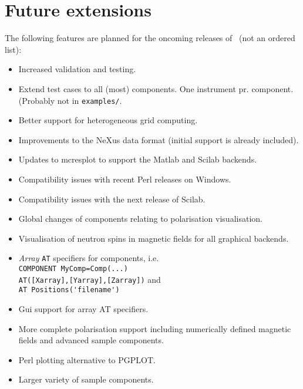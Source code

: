 \section{Future extensions}
\label{s:future}
The following features are planned for the oncoming releases of \MCS\ 
(not an ordered list):
\begin{itemize}
\item Increased validation and testing.
\item Extend test cases to all (most) components. One instrument
  pr. component. (Probably not in \verb+examples/+.
\item Better support for heterogeneous grid computing.
\item Improvements to the NeXus data format (initial support is
  already included).
\item Updates to mcresplot to support the Matlab and Scilab backends.
\item Compatibility issues with recent Perl releases on Windows.
\item Compatibility issues with the next release of Scilab.
\item Global changes of components relating to polarisation
  visualisation.
\item Visualisation of neutron spins in magnetic fields for all
  graphical backends.
\item \emph{Array} \verb+AT+ specifiers for components, i.e. \\
  \verb+COMPONENT MyComp=Comp(...)+\\\verb+AT([Xarray],[Yarray],[Zarray])+ and\\
  \verb+AT Positions('filename')+
\item Gui support for array AT specifiers.
\item More complete polarisation support including numerically defined
  magnetic fields and advanced sample components.
\item Perl plotting alternative to PGPLOT.
\item Larger variety of sample components.
\end{itemize}








